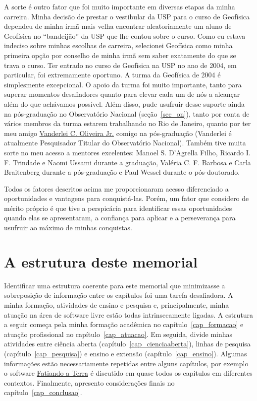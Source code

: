 \documentclass[10pt,a4paper,oneside]{book}
\begin{document}
A sorte é outro fator que foi muito importante em diversas etapas da minha
carreira.
Minha decisão de prestar o vestibular da USP para o curso de Geofísica dependeu
de minha irmã mais velha encontrar aleatoriamente um aluno de Geofísica no
``bandeijão'' da USP que lhe contou sobre o curso.
Como eu estava indeciso sobre minhas escolhas de carreira, selecionei Geofísica
como minha primeira opção por conselho de minha irmã sem saber exatamente do
que se trava o curso.
Ter entrado no curso de Geofísica na USP no ano de 2004, em particular, foi
extremamente oportuno.
A turma da Geofísica de 2004 é simplesmente excepcional.
O apoio da turma foi muito importante, tanto para superar momentos desafiadores
quanto para elevar cada um de nós a alcançar além do que achávamos possível.
Além disso, pude usufruir desse suporte ainda na pós-graduação no Observatório
Nacional (seção~\ref{sec_on}), tanto por conta de vários membros da turma
estarem trabalhando no Rio de Janeiro, quanto por ter meu amigo
\href{https://www.pinga-lab.org/people/oliveira-jr.html}{Vanderlei C. Oliveira Jr.}
comigo na pós-graduação (Vanderlei é atualmente Pesquisador Titular do
Observatório Nacional).
Também tive muita sorte no meu acesso a mentores excelentes:
Manoel S. D'Agrella Filho, Ricardo I. F. Trindade e Naomi Ussami
durante a graduação, Valéria C. F. Barbosa e Carla Braitenberg durante a
pós-graduação e Paul Wessel durante o pós-doutorado.

Todos os fatores descritos acima me proporcionaram acesso diferenciado a
oportunidades e vantagens para conquistá-las.
Porém, um fator que considero de mérito próprio é que tive a perspicácia para
identificar essas oportunidades quando elas se apresentaram, a confiança para
aplicar e a perseverança para usufruir ao máximo de minhas conquistas.

\section{A estrutura deste memorial}

Identificar uma estrutura coerente  para este memorial que minimizasse a
sobreposição de informação entre os capítulos foi uma tarefa desafiadora.
A minha formação, atividades de ensino e pesquisa e, principalmente, minha
atuação na área de software livre estão todas intrinsecamente ligadas.
A estrutura a seguir começa pela minha formação acadêmica no
capítulo~\ref{cap_formacao} e atuação profissional no
capítulo~\ref{cap_atuacao}.
Em seguida, divide minhas atividades
entre ciência aberta (capítulo~\ref{cap_cienciaaberta}),
linhas de pesquisa (capítulo~\ref{cap_pesquisa})
e ensino e extensão (capítulo~\ref{cap_ensino}).
Algumas informações estão necessariamente repetidas entre alguns capítulos,
por exemplo o software \href{https://www.fatiando.org}{Fatiando a Terra}
é discutido em quase todos os capítulos em diferentes contextos.
Finalmente, apresento considerações finais no capítulo~\ref{cap_conclusao}.
\end{document}

